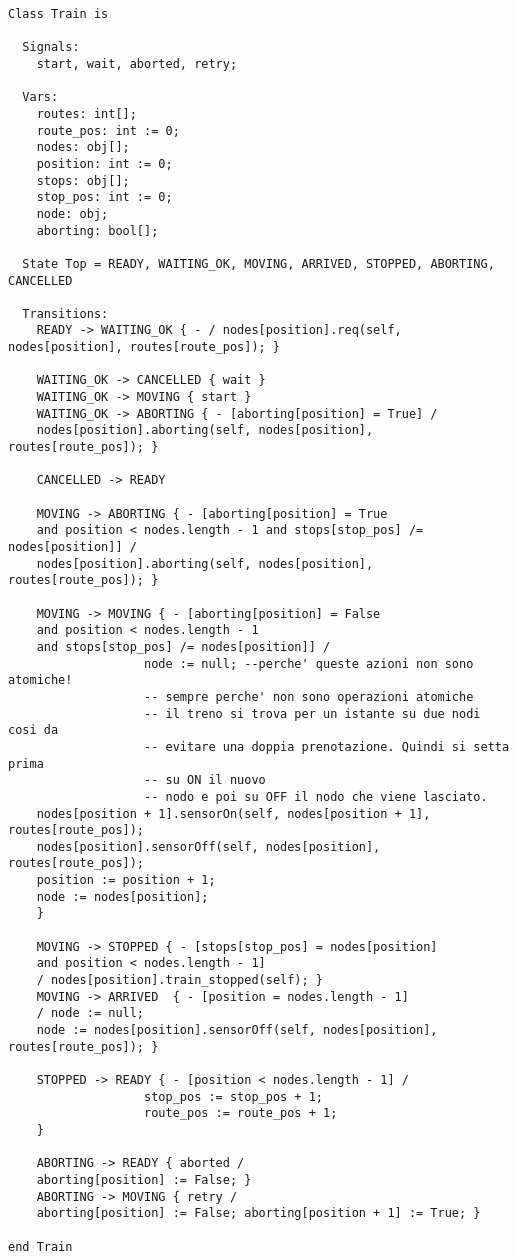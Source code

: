 \label{cap:code}
\begin{lstlisting}[caption={modello della classe Train}]
Class Train is

  Signals:
    start, wait, aborted, retry;

  Vars:
    routes: int[];
    route_pos: int := 0;
    nodes: obj[];
    position: int := 0;
    stops: obj[];
    stop_pos: int := 0;
    node: obj;
    aborting: bool[];

  State Top = READY, WAITING_OK, MOVING, ARRIVED, STOPPED, ABORTING, CANCELLED

  Transitions:
    READY -> WAITING_OK { - / nodes[position].req(self, nodes[position], routes[route_pos]); }

    WAITING_OK -> CANCELLED { wait }  
    WAITING_OK -> MOVING { start }
    WAITING_OK -> ABORTING { - [aborting[position] = True] / 
    nodes[position].aborting(self, nodes[position], routes[route_pos]); }
    
    CANCELLED -> READY

    MOVING -> ABORTING { - [aborting[position] = True 
    and position < nodes.length - 1 and stops[stop_pos] /= nodes[position]] / 
    nodes[position].aborting(self, nodes[position], routes[route_pos]); }
    
    MOVING -> MOVING { - [aborting[position] = False 
    and position < nodes.length - 1 
    and stops[stop_pos] /= nodes[position]] /                    
                   node := null; --perche' queste azioni non sono atomiche!
                   -- sempre perche' non sono operazioni atomiche
                   -- il treno si trova per un istante su due nodi cosi da
                   -- evitare una doppia prenotazione. Quindi si setta prima 
                   -- su ON il nuovo
                   -- nodo e poi su OFF il nodo che viene lasciato.
    nodes[position + 1].sensorOn(self, nodes[position + 1], routes[route_pos]);
    nodes[position].sensorOff(self, nodes[position], routes[route_pos]);
    position := position + 1;
    node := nodes[position];
    }

    MOVING -> STOPPED { - [stops[stop_pos] = nodes[position] 
    and position < nodes.length - 1] 
    / nodes[position].train_stopped(self); }
    MOVING -> ARRIVED  { - [position = nodes.length - 1] 
    / node := null; 
    node := nodes[position].sensorOff(self, nodes[position], routes[route_pos]); }
    
    STOPPED -> READY { - [position < nodes.length - 1] /
                   stop_pos := stop_pos + 1;
                   route_pos := route_pos + 1;
    }
    
    ABORTING -> READY { aborted / 
    aborting[position] := False; }
    ABORTING -> MOVING { retry / 
    aborting[position] := False; aborting[position + 1] := True; }

end Train
\end{lstlisting}
